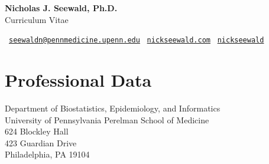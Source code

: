 \documentclass[letterpaper,11pt]{article} %
\begin{document}
 
	\begin{center}
		\headingfont
		\huge{\textbf{Nicholas J. Seewald, Ph.D.}} \\
		\Large{Curriculum Vitae}
	\end{center}
	
	\begin{center}
	 \  \href{mailto:nicholas.seewald@pennmedicine.upenn.edu}{\texttt{seewaldn@pennmedicine.upenn.edu}} \quad
	\faLaptop \  \href{https://www.nickseewald.com}{\texttt{nickseewald.com}} \quad
	\faGithub  \  \href{https://www.github.com/nickseewald}{\texttt{nickseewald}}
\end{center}


	\section*{Professional Data}

	\begin{minipage}[t]{.61\textwidth}
		Department of Biostatistics, Epidemiology, and Informatics \\
		University of Pennsylvania Perelman School of Medicine \\
		624 Blockley Hall \\
		423 Guardian Drive \\
		Philadelphia, PA 19104
	\end{minipage}

	\thispagestyle{firstpage} %

\end{document}
